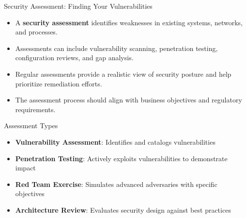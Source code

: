 \documentclass{beamer}
\begin{document}
                        \begin{frame}{Security Assessment: Finding Your Vulnerabilities}
                            \begin{itemize}
                                \item A \textbf{security assessment} identifies weaknesses in existing systems, networks, and processes.
                                \item Assessments can include vulnerability scanning, penetration testing, configuration reviews, and gap analysis.
                                \item Regular assessments provide a realistic view of security posture and help prioritize remediation efforts.
                                \item The assessment process should align with business objectives and regulatory requirements.
                            \end{itemize}
                            
                            \begin{exampleblock}{Assessment Types}
                            \begin{itemize}
                                \item \textbf{Vulnerability Assessment}: Identifies and catalogs vulnerabilities
                                \item \textbf{Penetration Testing}: Actively exploits vulnerabilities to demonstrate impact
                                \item \textbf{Red Team Exercise}: Simulates advanced adversaries with specific objectives
                                \item \textbf{Architecture Review}: Evaluates security design against best practices
                            \end{itemize}
                            \end{exampleblock}
                            \end{frame}
                            
\end{document}
